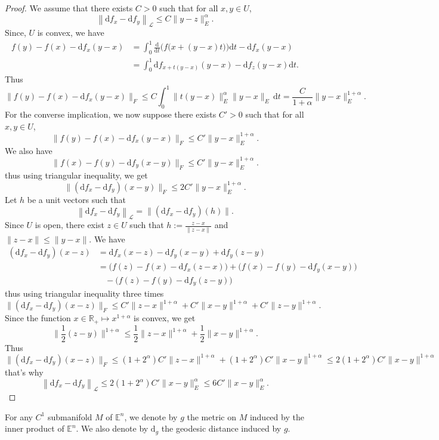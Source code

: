 \documentclass[11pt,reqno,a4paper]{article}%
\theoremstyle{definition}
\theoremstyle{remark}
\renewcommand{\leq}{\leqslant}
\newcommand{\opnorm}[1]{{\left\| #1 \right\|}_{\mathcal{L}}}
\renewcommand{\d}{\mathrm{d}}
\newcommand{\R}{\mathbb{R}}
\newcommand{\E}{\mathbb{E}}
\renewcommand{\d}{\mathrm{d}}
\begin{document}
\begin{proof}
    We assume that there exists $C > 0$ such that for all $x,y \in U$,
    \[ \opnorm{\d f_x - \d f_y} \leq C \|y -z\|_E^\alpha.\]
    Since, $U$ is convex, we have
    \begin{align*}
        f(y) - f(x) - \d f_x(y-x) &= \int_0^1 \frac{\d}{\d t} \Big( f\big(x + (y-x)t\big) \Big) \d t -  \d f_x(y-x) \\&=  \int_0^1  \d f_{x + t(y-x) }(y-x) -  \d f_z(y-x) \d t.
    \end{align*}
    Thus 
    \[ \| f(y) - f(x) - \d f_x(y-x)\|_F \leq C \int_0^1 \| t (y-x) \|^\alpha_E \| y-x\|_E \, \d t = \frac{C}{1+\alpha} \|y - x\|_E^{1 + \alpha}. \]
    For the converse implication, we now suppose there exists $C' > 0$ such that for all $x ,y \in U$,
    \[\| f(y) - f(x) - \d f_x(y-x)\|_F \leq C' \|y-x\|_E^{1 + \alpha}.\]
    We also have
    \[\| f(x) - f(y) - \d f_y(x-y)\|_F \leq C' \|y-x\|_E^{1 + \alpha}.\]
    thus using triangular inequality, we get
     \[\| (\d f_x - \d f_y)(x-y)\|_F \leq 2 C' \|y -x\|_E^{1 + \alpha}.\]
     Let $h$ be a unit vectors such that
     \[ \opnorm{ \d f_x - \d f_y} = \| (\d f_x - \d f_y)(h)\|. \]
     Since $U$ is open, there exist $z \in U$ such that  $h := \frac{z-x}{\|z-x\|}$ and $\|z-x\| \leq \| y - x \|$.
     We have
     \begin{align*}
         (\d f_x - \d f_y)(x-z) &= \d f_x(x-z) - \d f_y(x-y) + \d f_y(z-y) \\
         &= \big( f(z) - f(x) - \d f_x(z-x) \big) + \big( f(x) - f(y) - \d f_y(x-y) \big) \\
         &~~~~- \big( f(z) - f(y) - \d f_y(z-y) \big)
     \end{align*}
     thus using triangular inequality three times
     \[ \| (\d f_x - \d f_y)(x-z) \|_F \leq C' \|z-x\|^{1+\alpha} + C'\|x-y\|^{1+\alpha} + C' \| z-y\|^{1+\alpha}.  \]
     Since the function $x \in \R_+ \mapsto x^{1+\alpha}$ is convex, we get 
     $$ \|\frac{1}{2} (z-y) \|^{1+\alpha} \leq \frac{1}{2} \|z-x\|^{1+\alpha} + \frac{1}{2} \|x-y\|^{1+\alpha}.$$
     Thus
     \[ \| (\d f_x - \d f_y)(x-z) \|_F \leq (1 + 2^{\alpha}) C' \|z-x\|^{1+\alpha} +   (1 + 2^{\alpha}) C' \|x-y\|^{1+\alpha} \leq 2 (1 + 2^{\alpha}) C' \|x-y\|^{1+\alpha} \]
     that's why
     \[\opnorm{ \d f_x - \d f_y} \leq  2 (1 + 2^{\alpha}) C' \|x -y\|_E^\alpha \leq  6 C' \|x -y\|_E^\alpha.\]
\end{proof}


\noindent For any $C^1$ submanifold $M$ of $\E^n$, we denote by $g$ the metric on $M$ induced by the inner product of $\E^n$. We also denote by $\d_{g}$ the geodesic distance induced by $g$.
\end{document}

